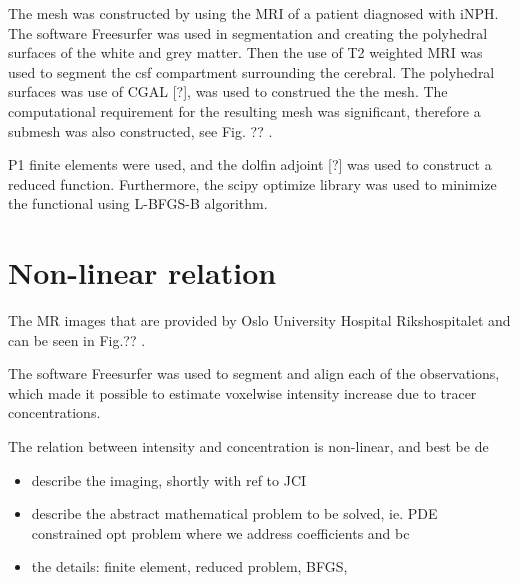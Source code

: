 \documentclass[11pt,a4paper]{article}
\begin{document}
The mesh was constructed by using the MRI of a patient diagnosed with iNPH. The software Freesurfer was used in segmentation and creating the polyhedral surfaces of the white and grey matter. Then the use of T2 weighted MRI was used to segment the csf compartment surrounding the cerebral. The polyhedral surfaces was use of CGAL [?], was used to construed the the mesh. The computational requirement for the resulting mesh was significant, therefore a submesh was also constructed, see Fig. ?? . 
























P1 finite elements were used, and the dolfin adjoint [?] was used to construct a reduced function. Furthermore, the scipy optimize library was used to minimize the functional using L-BFGS-B algorithm.   




\section*{Non-linear relation}
The MR images that are provided by Oslo University Hospital Rikshospitalet and can be seen in Fig.?? . 


The software Freesurfer was used to segment and align each of the observations, which made it possible to estimate voxelwise intensity increase due to tracer concentrations. 

The relation between intensity and concentration is non-linear, and best be de


 

\begin{itemize}
\item describe the imaging, shortly with ref to JCI  
\item describe the abstract mathematical problem to be solved, ie. PDE constrained opt problem where we 
address coefficients and bc  
\item the details: finite element, reduced problem, BFGS,  
\end{itemize}
\end{document}
